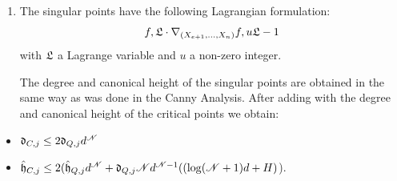 \documentclass[12pt]{article}
\newcommand{\ZZ}{{\mathbb{Z}}}
\def\C{\mathbb{C}}
\def\P{\mathbb{P}}
\def\fd{\frak{d}}
\def\fh{\frak{h}}
\def\C{\mathbb{C}}
\def\P{\mathbb{P}}
\begin{document}
\begin{itemize}
\begin{enumerate}
\begin{enumerate}
Consider the class of $S:$ 
\begin{align*}
    [S]_{\ZZ} = \hat{\fh}_{Q,j}\eta \theta^{e-1} + \fd_{Q,j} \theta^e \in \mathbb{R}[\eta,\theta]/(\eta^2,\theta^{e+1}).
\end{align*}
%

The polynomial representing \[[S \# \P_{\C}^{\mathscr{N}-e-1}]_{\ZZ}\] is equal to the polynomial representing $[S]_{\ZZ}$, so that our cylinder containing $Q(X_1,\hdots,X_e)$ is represented by $[S]_{\ZZ}$.
%






Now by Property (3) from Section \ref{sec:CanonicalH}, the intersection of $Q$ with the equations defining (\ref{eqMainLW2Wi}) obtain 
%
\begin{align*}
    &[S]_{\ZZ}\cdot ((\log(\mathscr{N}+1)d + H)\eta + d\theta)^{\mathscr{N} } \\
    &\equiv(\hat{\fh}_{Q,j}\eta \theta^{e-1} + \fd_{Q,j} \theta^e) \cdot \left( \mathscr{N}d^{\mathscr{N}-1}((\log(\mathscr{N}+1)d + H))\eta \theta^{\mathscr{N}-1} + d^{\mathscr{N}} \theta^{\mathscr{N}}\right) \\
    &\mod (\eta^2,\theta^{\mathscr{N}+1})) \\
    &\equiv \left(\hat{\fh}_{Q,j}d^{\mathscr{N}} + \fd_{Q,j} \mathscr{N}d^{\mathscr{N}-1}((\log(\mathscr{N}+1)d + H))\right)\eta \theta^{(\mathscr{N}+e)-1} + \fd_{Q,j} d^{\mathscr{N}} \theta^{(\mathscr{N}+e)} \\
    &\mod (\eta^2,\theta^{(\mathscr{N}+e)+1}).
\end{align*}
\item The singular points have the following Lagrangian formulation:
%
    \begin{equation}    
    f,\frak{L}\cdot \nabla_{(X_{e+1},\hdots,X_n)} f,u\frak{L}-1
    \end{equation}
%
    with $\frak{L}$ a Lagrange variable and $u$ a non-zero integer.

    The degree and canonical height of the singular points are obtained in the same way as was done in the Canny Analysis. After adding with the degree and canonical height of the critical points we obtain: 
%
\end{enumerate}
%
\begin{itemize}
    \item $\fd_{C,j} \leq 2\fd_{Q,j}d^{\mathscr{N}}$
    \item $\hat{\fh}_{C,j} \leq 2(\hat{\fh}_{Q,j}d^{\mathscr{N}} + \fd_{Q,j} \mathscr{N}d^{\mathscr{N}-1}((\log(\mathscr{N}+1)d + H)$).
\end{itemize}
%


\end{enumerate}
\end{itemize}
\end{document}
